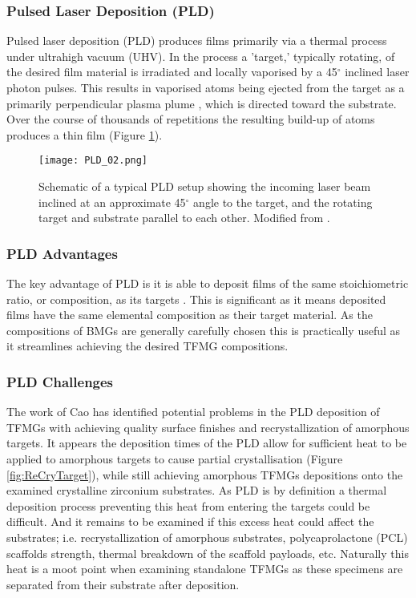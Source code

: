 \documentclass[draft,a4paper,12pt,oneside]{report}%
\begin{document}
\subsubsection{Pulsed Laser Deposition (PLD)}
Pulsed laser deposition (PLD) produces films primarily via a thermal process under ultrahigh vacuum (UHV). In the process a 'target,' typically rotating, of the desired film material is irradiated and locally vaporised by a 45$^{\circ}$ inclined laser photon pulses. This results in vaporised atoms being ejected from the target as a primarily perpendicular plasma plume , which is directed toward the substrate. Over the course of thousands of repetitions the resulting build-up of atoms produces a thin film (Figure \ref{fig:PLD}). 

\begin{figure}[htbp]
	\centering
	\texttt{[image: PLD\_02.png]}
	\caption[PLD Schematic]{Schematic of a typical PLD setup showing the incoming laser beam inclined at an approximate 45$^{\circ}$ angle to the target, and the rotating target and substrate parallel to each other. Modified from \cite{Krebs1993}.}
	\label{fig:PLD}
\end{figure}

\subsubsection{PLD Advantages}
The key advantage of PLD is it is able to deposit films of the same stoichiometric ratio, or composition, as its targets \cite{Dijkkamp1987, Heitz1990}. This is significant as it means deposited films have the same elemental composition as their target material. As the compositions of BMGs are generally carefully chosen this is practically useful as it streamlines achieving the desired TFMG compositions. 

\subsubsection{PLD Challenges}
The work of Cao \cite{Cao2013} has identified potential problems in the PLD deposition of TFMGs with achieving quality surface finishes and recrystallization of amorphous targets. It appears the deposition times of the PLD allow for sufficient heat to be applied to amorphous targets to cause partial crystallisation (Figure \ref{fig:ReCryTarget}), while still achieving amorphous TFMGs depositions onto the examined crystalline zirconium substrates. As PLD is by definition a thermal deposition process preventing this heat from entering the targets could be difficult. And it remains to be examined if this excess heat could affect the substrates; i.e. recrystallization of amorphous substrates, polycaprolactone (PCL) scaffolds strength, thermal breakdown of the scaffold payloads, etc. Naturally this heat is a moot point when examining standalone TFMGs as these specimens are separated from their substrate after deposition. 
\end{document}
